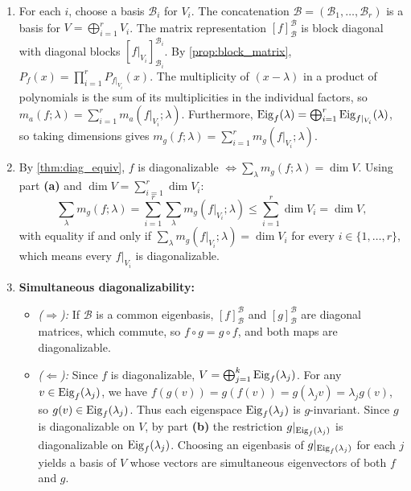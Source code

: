 \begin{exercisesolution}
\label{sol:direct_sum_multiplicities_and_simultaneous_diagonalizability}
\begin{enumerate}[label=\textbf{(\alph*)}]
    \item For each $i$, choose a basis $\mathcal{B}_i$ for $V_i$. The concatenation $\mathcal{B} = (\mathcal{B}_1, \dots, \mathcal{B}_r)$ is a basis for $V = \bigoplus_{i=1}^r V_i$.
    The matrix representation $[f]_\mathcal{B}^\mathcal{B}$ is block diagonal with diagonal blocks $[f|_{V_i}]_{\mathcal{B}_i}^{\mathcal{B}_i}$.
    By \cref{prop:block_matrix}, $P_f(x) = \prod_{i=1}^r P_{f|_{V_i}}(x)$.
    The multiplicity of $(x - \lambda)$ in a product of polynomials is the sum of its multiplicities in the individual factors, so $m_a(f; \lambda) = \sum_{i=1}^r m_a(f|_{V_i}; \lambda)$.
    Furthermore, $\operatorname{Eig}_f(\lambda) = \bigoplus_{i=1}^r \operatorname{Eig}_{f|_{V_i}}(\lambda)$, so taking dimensions gives $m_g(f; \lambda) = \sum_{i=1}^r m_g(f|_{V_i}; \lambda)$.

    \item By \cref{thm:diag_equiv}, $f$ is diagonalizable $\iff \sum_\lambda m_g(f; \lambda) = \dim V$.
    Using part \textbf{(a)} and $\dim V = \sum_{i=1}^r \dim V_i$:
    \[
    \sum_{\lambda} m_g(f; \lambda) = \sum_{i=1}^r \sum_{\lambda} m_g(f|_{V_i}; \lambda) \le \sum_{i=1}^r \dim V_i = \dim V,
    \]
    with equality if and only if $\sum_\lambda m_g(f|_{V_i}; \lambda) = \dim V_i$ for every $i \in \{1, \dots, r\}$, which means every $f|_{V_i}$ is diagonalizable.

    \item \textbf{Simultaneous diagonalizability:}
    \begin{itemize}
        \item \emph{($\Rightarrow$):} If $\mathcal{B}$ is a common eigenbasis, $[f]_\mathcal{B}^\mathcal{B}$ and $[g]_\mathcal{B}^\mathcal{B}$ are diagonal matrices, which commute, so $f \circ g = g \circ f$, and both maps are diagonalizable.
        \item \emph{($\Leftarrow$):} Since $f$ is diagonalizable, $V = \bigoplus_{j=1}^k \operatorname{Eig}_f(\lambda_j)$.
        For any $v \in \operatorname{Eig}_f(\lambda_j)$, we have $f(g(v)) = g(f(v)) = g(\lambda_j v) = \lambda_j g(v)$, so $g(v) \in \operatorname{Eig}_f(\lambda_j)$.
        Thus each eigenspace $\operatorname{Eig}_f(\lambda_j)$ is $g$-invariant.
        Since $g$ is diagonalizable on $V$, by part \textbf{(b)} the restriction $g|_{\operatorname{Eig}_f(\lambda_j)}$ is diagonalizable on $\operatorname{Eig}_f(\lambda_j)$.
        Choosing an eigenbasis of $g|_{\operatorname{Eig}_f(\lambda_j)}$ for each $j$ yields a basis of $V$ whose vectors are simultaneous eigenvectors of both $f$ and $g$. \qedhere
    \end{itemize}
\end{enumerate}
\end{exercisesolution}

